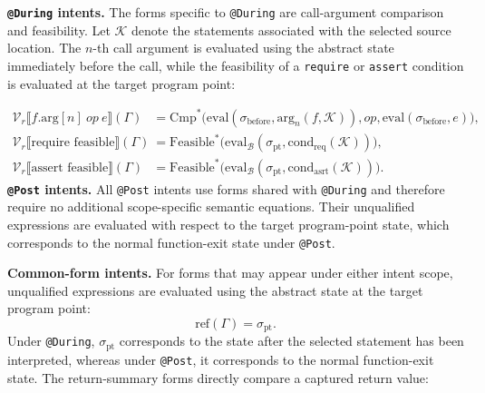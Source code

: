 \documentclass[11pt,oneside]{report}
\theoremstyle{plain}
\theoremstyle{definition}
\theoremstyle{remark}
\begin{document}
\smallskip
\noindent\textbf{\texttt{@During} intents.}
The forms specific to \texttt{@During} are call-argument comparison and
feasibility.
Let $\mathcal{K}$ denote the statements associated with the selected source
location.
The $n$-th call argument is evaluated using the abstract state immediately
before the call, while the feasibility of a \texttt{require} or
\texttt{assert} condition is evaluated at the target program point:

\begin{align*}
\mathcal{V}_{r}\llbracket
f.\text{arg}[n]\ \mathit{op}\ e
\rrbracket(\Gamma)
&=
\mathrm{Cmp}^{*}\bigl(
\mathrm{eval}(
\sigma_{\text{before}},
\mathrm{arg}_n(f,\mathcal{K})
),
\mathit{op},
\mathrm{eval}(\sigma_{\text{before}},e)
\bigr),
\\[3pt]
%
\mathcal{V}_{r}\llbracket
\text{require feasible}
\rrbracket(\Gamma)
&=
\mathrm{Feasible}^{*}\bigl(
\mathrm{eval}_{\mathcal{B}}
(
\sigma_{\text{pt}},
\mathrm{cond}_{\mathrm{req}}(\mathcal{K})
)
\bigr),
\\[3pt]
%
\mathcal{V}_{r}\llbracket
\text{assert feasible}
\rrbracket(\Gamma)
&=
\mathrm{Feasible}^{*}\bigl(
\mathrm{eval}_{\mathcal{B}}
(
\sigma_{\text{pt}},
\mathrm{cond}_{\mathrm{asrt}}(\mathcal{K})
)
\bigr).
\end{align*}
\smallskip
\noindent\textbf{\texttt{@Post} intents.}
All \texttt{@Post} intents use forms shared with \texttt{@During} and therefore
require no additional scope-specific semantic equations.
Their unqualified expressions are evaluated with respect to the target
program-point state, which corresponds to the normal function-exit state under
\texttt{@Post}.

\smallskip
\noindent\textbf{Common-form intents.}
For forms that may appear under either intent scope, unqualified expressions are evaluated using the abstract state at the target program point:
\[
\mathrm{ref}(\Gamma)
=
\sigma_{\text{pt}}.
\]
Under \texttt{@During}, \(\sigma_{\text{pt}}\) corresponds to the state after the selected statement has been interpreted, whereas under \texttt{@Post}, it corresponds to the normal function-exit state.
The return-summary forms directly compare a captured return value:
\end{document}

